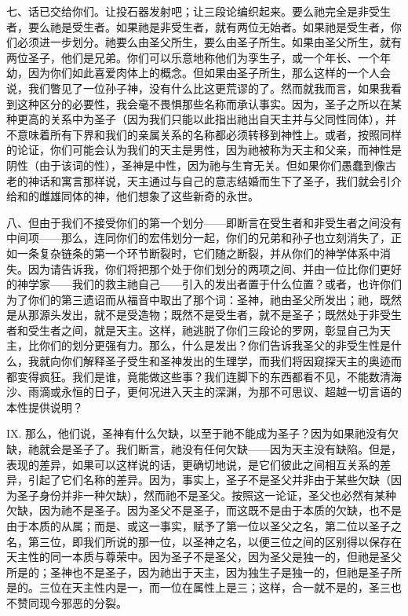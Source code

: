 七、话已交给你们。让投石器发射吧；让三段论编织起来。要么祂完全是非受生者，要么祂是受生者。如果祂是非受生者，就有两位无始者。如果祂是受生者，你们必须进一步划分。祂要么由圣父所生，要么由圣子所生。如果由圣父所生，就有两位圣子，他们是兄弟。你们可以乐意地称他们为孪生子，或一个年长、一个年幼，因为你们如此喜爱肉体上的概念。但如果由圣子所生，那么这样的一个人会说，我们瞥见了一位孙子神，没有什么比这更荒谬的了。然而就我而言，如果我看到这种区分的必要性，我会毫不畏惧那些名称而承认事实。因为，圣子之所以在某种更高的关系中为圣子（因为我们只能以此指出祂出自天主并与父同性同体），并不意味着所有下界和我们的亲属关系的名称都必须转移到神性上。或者，按照同样的论证，你们可能会认为我们的天主是男性，因为祂被称为天主和父亲，而神性是阴性（由于该词的性），圣神是中性，因为祂与生育无关。但如果你们愚蠢到像古老的神话和寓言那样说，天主通过与自己的意志结婚而生下了圣子，我们就会引介给和的雌雄同体的神，他们想象了这些新奇的永世。\par

八、但由于我们不接受你们的第一个划分——即断言在受生者和非受生者之间没有中间项——那么，连同你们的宏伟划分一起，你们的兄弟和孙子也立刻消失了，正如一条复杂链条的第一个环节断裂时，它们随之断裂，并从你们的神学体系中消失。因为请告诉我，你们将把那个处于你们划分的两项之间、并由一位比你们更好的神学家——我们的救主祂自己——引入的发出者置于什么位置？或者，也许你们为了你们的第三遗诏而从福音中取出了那个词：圣神，祂由圣父所发出；祂，既然是从那源头发出，就不是受造物；既然不是受生者，就不是圣子；既然处于非受生者和受生者之间，就是天主。这样，祂逃脱了你们三段论的罗网，彰显自己为天主，比你们的划分更强有力。那么，什么是发出？你们告诉我圣父的非受生性是什么，我就向你们解释圣子受生和圣神发出的生理学，而我们将因窥探天主的奥迹而都变得疯狂。我们是谁，竟能做这些事？我们连脚下的东西都看不见，不能数清海沙、雨滴或永恒的日子，更何况进入天主的深渊，为那不可思议、超越一切言语的本性提供说明？\par

IX. 那么，他们说，圣神有什么欠缺，以至于祂不能成为圣子？因为如果祂没有欠缺，祂就会是圣子了。我们断言，祂没有任何欠缺——因为天主没有缺陷。但是，表现的差异，如果可以这样说的话，更确切地说，是它们彼此之间相互关系的差异，引起了它们名称的差异。因为，事实上，圣子不是圣父并非由于某些欠缺（因为圣子身份并非一种欠缺），然而祂不是圣父。按照这一论证，圣父也必然有某种欠缺，因为祂不是圣子。因为圣父不是圣子，而这既不是由于本质的欠缺，也不是由于本质的从属；而是、或这一事实，赋予了第一位以圣父之名，第二位以圣子之名，第三位，即我们所说的那一位，以圣神之名，以便三位之间的区别得以保存在天主性的同一本质与尊荣中。因为圣子不是圣父，因为圣父是独一的，但祂是圣父所是的；圣神也不是圣子，因为祂出于天主，因为独生子是独一的，但祂是圣子所是的。三位在天主性内是一，而一位在属性上是三；这样，合一就不是的，圣三也不赞同现今邪恶的分裂。\par

